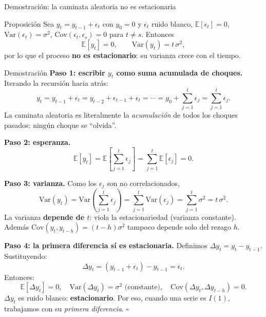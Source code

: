\documentclass{beamer}
\begin{document}
\begin{frame}[allowframebreaks]{Demostración: la caminata aleatoria no es estacionaria}

\begin{alertblock}{Proposición}
Sea $y_t = y_{t-1} + \epsilon_t$ con $y_0=0$ y $\epsilon_t$ ruido blanco, $\mathbb{E}[\epsilon_t]=0$, $\text{Var}(\epsilon_t)=\sigma^2$, $\text{Cov}(\epsilon_t,\epsilon_s)=0$ para $t\neq s$. Entonces
\[
\mathbb{E}[y_t]=0, \qquad \text{Var}(y_t)=t\,\sigma^2,
\]
por lo que el proceso \textbf{no es estacionario}: su varianza crece con el tiempo.
\end{alertblock}

\begin{exampleblock}{Demostración}
\textbf{Paso 1: escribir $y_t$ como suma acumulada de choques.}
Iterando la recursión hacia atrás:
\[
y_t = y_{t-1}+\epsilon_t = y_{t-2}+\epsilon_{t-1}+\epsilon_t = \cdots = y_0 + \sum_{j=1}^{t}\epsilon_j = \sum_{j=1}^{t}\epsilon_j.
\]
La caminata aleatoria es literalmente la \emph{acumulación} de todos los choques pasados: ningún choque se ``olvida''.

\framebreak

\textbf{Paso 2: esperanza.}
\[
\mathbb{E}[y_t]=\mathbb{E}\!\left[\sum_{j=1}^{t}\epsilon_j\right]=\sum_{j=1}^{t}\mathbb{E}[\epsilon_j]=0.
\]

\textbf{Paso 3: varianza.} Como los $\epsilon_j$ son no correlacionados,
\[
\text{Var}(y_t)=\text{Var}\!\left(\sum_{j=1}^{t}\epsilon_j\right)=\sum_{j=1}^{t}\text{Var}(\epsilon_j)=\sum_{j=1}^{t}\sigma^2 = t\,\sigma^2.
\]
La varianza \textbf{depende de $t$}: viola la estacionariedad (varianza constante). Además $\text{Cov}(y_t,y_{t-h})=(t-h)\sigma^2$ tampoco depende solo del rezago $h$.

\framebreak

\textbf{Paso 4: la primera diferencia sí es estacionaria.}
Definimos $\Delta y_t = y_t - y_{t-1}$. Sustituyendo:
\[
\Delta y_t = (y_{t-1}+\epsilon_t)-y_{t-1}=\epsilon_t.
\]
Entonces:
\[
\mathbb{E}[\Delta y_t]=0,\quad \text{Var}(\Delta y_t)=\sigma^2 \text{ (constante)},\quad \text{Cov}(\Delta y_t,\Delta y_{t-h})=0.
\]
$\Delta y_t$ es ruido blanco: \textbf{estacionario}. Por eso, cuando una serie es $I(1)$, trabajamos con su \emph{primera diferencia}. \hfill $\square$
\end{exampleblock}

\end{frame}
\end{document}
